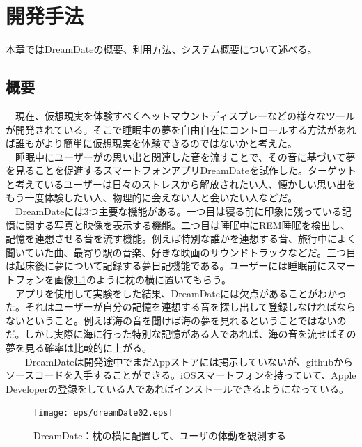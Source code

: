 \chapter{開発手法}
\label{chap:coding}

本章ではDreamDateの概要、利用方法、システム概要について述べる。

\section{概要}
　現在、仮想現実を体験すべくヘットマウントディスプレーなどの様々なツールが開発されている。そこで睡眠中の夢を自由自在にコントロールする方法があれば誰もがより簡単に仮想現実を体験できるのではないかと考えた。\\
　睡眠中にユーザーがの思い出と関連した音を流すことで、その音に基づいて夢を見ることを促進するスマートフォンアプリDreamDateを試作した。ターゲットと考えているユーザーは日々のストレスから解放されたい人、懐かしい思い出をもう一度体験したい人、物理的に会えない人と会いたい人などだ。\\
　DreamDateには3つ主要な機能がある。一つ目は寝る前に印象に残っている記憶に関する写真と映像を表示する機能。二つ目は睡眠中にREM睡眠を検出し、記憶を連想させる音を流す機能。例えば特別な誰かを連想する音、旅行中によく聞いていた曲、最寄り駅の音楽、好きな映画のサウンドトラックなどだ。三つ目は起床後に夢について記録する夢日記機能である。ユーザーには睡眠前にスマートフォンを画像\ref{DreamDateImage}のように枕の横に置いてもらう。\\
　アプリを使用して実験をした結果、DreamDateには欠点があることがわかった。それはユーザーが自分の記憶を連想する音を探し出して登録しなければならないということ。例えば海の音を聞けば海の夢を見れるということではないのだ。しかし実際に海に行った特別な記憶がある人であれば、海の音を流せばその夢を見る確率は比較的に上がる。\\
　　DreamDateは開発途中でまだAppストアには掲示していないが、githubからソースコードを入手することができる。iOSスマートフォンを持っていて、Apple Developerの登録をしている人であればインストールできるようになっている。

\begin{figure}[htbp]
\begin{center}
\texttt{[image: eps/dreamDate02.eps]}
\caption{DreamDate：枕の横に配置して、ユーザの体動を観測する}
\label{DreamDateImage}
\end{center}
\end{figure}

